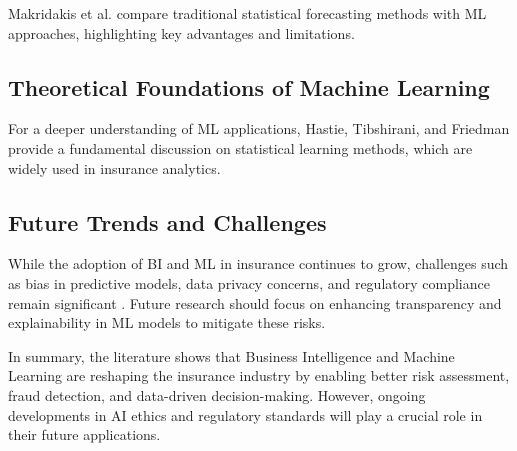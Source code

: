 Makridakis et al. \cite{makridakis2018} compare traditional statistical forecasting methods with ML approaches, highlighting key advantages and limitations.

\subsection{Theoretical Foundations of Machine Learning}

For a deeper understanding of ML applications, Hastie, Tibshirani, and Friedman \cite{hastie2009} provide a fundamental discussion on statistical learning methods, which are widely used in insurance analytics.

\subsection{Future Trends and Challenges}

While the adoption of BI and ML in insurance continues to grow, challenges such as bias in predictive models, data privacy concerns, and regulatory compliance remain significant \cite{wuthrich2019}. Future research should focus on enhancing transparency and explainability in ML models to mitigate these risks.

\noindent In summary, the literature shows that Business Intelligence and Machine Learning are reshaping the insurance industry by enabling better risk assessment, fraud detection, and data-driven decision-making. However, ongoing developments in AI ethics and regulatory standards will play a crucial role in their future applications.